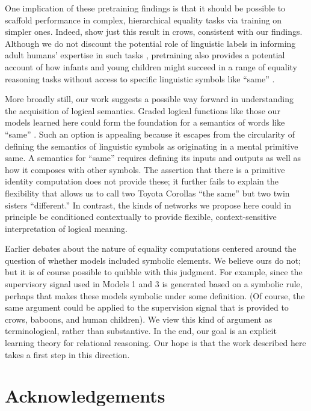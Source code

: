 \documentclass{article}
\renewcommand{\cite}{\citep}
\begin{document}
One implication of these pretraining findings is that it should be possible to scaffold performance in complex, hierarchical equality tasks via training on simpler ones. Indeed, \citet{smirnova2015} show just this result in crows, consistent with our findings. Although we do not discount the potential role of linguistic labels in informing adult humans' expertise in such tasks \cite{gentner2003}, pretraining also provides a potential account of how infants and young children might succeed in a range of equality reasoning tasks without access to specific linguistic symbols like ``same'' \cite{walker:2016,ferry:2015,hochmann2016}.

More broadly still, our work suggests a possible way forward in understanding the acquisition of logical semantics. Graded logical functions like those our models learned here could form the foundation for a semantics of words like ``same'' \cite{potts2019}. Such an option is appealing because it escapes from the circularity of defining the semantics of linguistic symbols as originating in a mental primitive {\sc same}. A semantics for ``same'' requires defining its inputs and outputs as well as how it composes with other symbols. The assertion that there is a primitive identity computation does not provide these; it further fails to explain the flexibility that allows us to call two Toyota Corollas ``the same'' but two twin sisters ``different.'' In contrast, the kinds of networks we propose here could in principle be conditioned contextually to provide flexible, context-sensitive interpretation of logical meaning.

Earlier debates about the nature of equality computations centered around the question of whether models included symbolic elements. We believe ours do not; but it is of course possible to quibble with this judgment. For example, since the supervisory signal used in Models 1 and 3 is generated based on a symbolic rule, perhaps that makes these models symbolic under some definition. (Of course, the same argument could be applied to the supervision signal that is provided to crows, baboons, and human children). We view this kind of argument as terminological, rather than substantive. In the end, our goal is an explicit learning theory for relational reasoning. Our hope is that the work described here takes a first step in this direction.



\section*{Acknowledgements}
\end{document}
